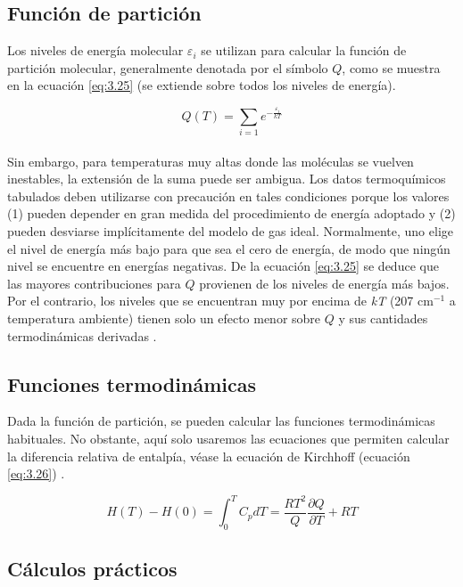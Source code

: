 \subsection{Función de partición}

Los niveles de energía molecular $\varepsilon_{i}$ se utilizan para calcular la función de partición molecular, generalmente denotada por el símbolo $Q$, como se muestra en la ecuación \ref{eq:3.25} (se extiende sobre todos los niveles de energía). 

\begin{equation}
Q(T) =  \sum_{i=1} e^{-\frac{\varepsilon_{i}}{kT}}
\label{eq:3.25}
\end{equation}\\

Sin embargo, para temperaturas muy altas donde las moléculas se vuelven inestables, la extensión de la suma puede ser ambigua. Los datos termoquímicos tabulados deben utilizarse con precaución en tales condiciones porque los valores (1) pueden depender en gran medida del procedimiento de energía adoptado y (2) pueden desviarse implícitamente del modelo de gas ideal. Normalmente, uno elige el nivel de energía más bajo para que sea el cero de energía, de modo que ningún nivel se encuentre en energías negativas. De la ecuación \ref{eq:3.25} se deduce que las mayores contribuciones para $Q$ provienen de los niveles de energía más bajos. Por el contrario, los niveles que se encuentran muy por encima de \textit{kT} (207 cm$^{-1}$ a temperatura ambiente) tienen solo un efecto menor sobre $Q$ y sus cantidades termodinámicas derivadas \cite{Irikura1998}.\\

\subsection{Funciones termodinámicas}

Dada la función de partición, se pueden calcular las funciones termodinámicas habituales. No obstante, aquí solo usaremos las ecuaciones que permiten calcular la diferencia relativa de entalpía, véase la ecuación de Kirchhoff (ecuación \ref{eq:3.26}) \cite{Irikura1998}.

\begin{equation}
H(T)-H(0) = \int_{0} ^{T} C_{p} dT = \frac{RT^{2}}{Q} \frac{\partial Q}{\partial T} + RT
\label{eq:3.26}
\end{equation}

\subsection{Cálculos prácticos}

